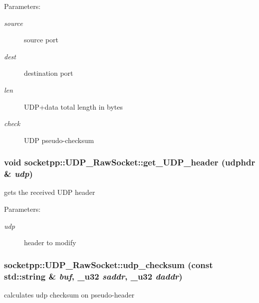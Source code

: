 \begin{Desc}
\item[Parameters:]
\begin{description}
\item[{\em source}]source port \item[{\em dest}]destination port \item[{\em len}]UDP+data total length in bytes \item[{\em check}]UDP pseudo-checksum \end{description}
\end{Desc}
\hypertarget{classsocketpp_1_1UDP__RawSocket_597a30fc537dce06c85663add29defdc}{
\subsubsection[{get\_\-UDP\_\-header}]{\setlength{\rightskip}{0pt plus 5cm}void socketpp::UDP\_\-RawSocket::get\_\-UDP\_\-header (udphdr \& {\em udp})}}
\label{classsocketpp_1_1UDP__RawSocket_597a30fc537dce06c85663add29defdc}


gets the received UDP header 

\begin{Desc}
\item[Parameters:]
\begin{description}
\item[{\em udp}]header to modify \end{description}
\end{Desc}
\hypertarget{classsocketpp_1_1UDP__RawSocket_166b30d9061b06336dc637cd3a25d12f}{
\subsubsection[{udp\_\-checksum}]{ socketpp::UDP\_\-RawSocket::udp\_\-checksum (const std::string \& {\em buf}, \/  {\bf \_\-u32} {\em saddr}, \/  {\bf \_\-u32} {\em daddr})}}
\label{classsocketpp_1_1UDP__RawSocket_166b30d9061b06336dc637cd3a25d12f}


calculates udp checksum on pseudo-header 

